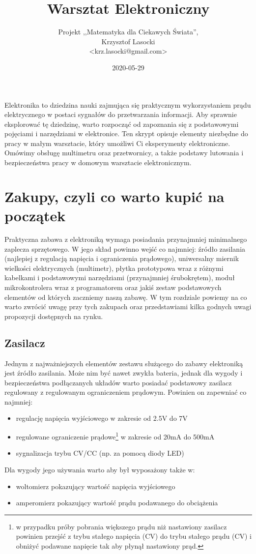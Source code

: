\documentclass{pdfBooklets}
\title{Warsztat Elektroniczny}
\author{%
	Projekt ,,Matematyka dla Ciekawych Świata'',\\
	Krzysztof Lasocki\\\normalsize\ttfamily <krz.lasocki@gmail.com>
}
\date  {2020-05-29}
\begin{document}
\maketitle

Elektronika to dziedzina nauki zajmująca się praktycznym wykorzystaniem prądu elektrycznego w postaci sygnałów do przetwarzania
informacji. Aby sprawnie eksplorować tę dziedzinę, warto rozpocząć od zapoznania się z podstawowymi pojęciami i narzędziami w
elektronice. Ten skrypt opisuje elementy niezbędne do pracy w małym warsztacie, który umożliwi Ci eksperymenty elektroniczne.
Omówimy obsługę multimetru oraz przetwornicy, a także podstawy lutowania i bezpieczeństwa pracy w domowym warsztacie elektronicznym.

\section{Zakupy, czyli co warto kupić na początek}

Praktyczna zabawa z elektroniką wymaga posiadania przynajmniej minimalnego zaplecza sprzętowego.
W jego skład powinno wejść co najmniej:
	źródło zasilania (najlepiej z regulacją napięcia i ograniczenia prądowego),
	uniwersalny miernik wielkości elektrycznych (multimetr),
	płytka prototypowa wraz z różnymi kabelkami i podstawowymi narzędziami (przynajmniej śrubokrętem),
	moduł mikrokontrolera wraz z programatorem
	oraz jakiś zestaw podstawowych elementów od których zaczniemy naszą zabawę.
W tym rozdziale powiemy na co warto zwrócić uwagę przy tych zakupach oraz przedstawiami kilka godnych uwagi propozycji dostępnych na rynku.

\subsection{Zasilacz}
	Jednym z najważniejszych elementów zestawu służącego do zabawy elektroniką jest źródło zasilania.
	Może nim być nawet zwykła bateria, jednak dla wygody i bezpieczeństwa podłączanych układów warto posiadać podstawowy zasilacz regulowany z regulowanym ograniczeniem prądowym.
	Powinien on zapewniać co najmniej:
	\begin{itemize}
		\item regulację napięcia wyjściowego w zakresie od 2.5V do 7V
		\item regulowane ograniczenie prądowe\footnote{
			w przypadku próby pobrania większego prądu niż nastawiony zasilacz powinien
			przejść z trybu stałego napięcia (CV) do trybu stałego prądu (CV)
			i obniżyć podawane napięcie tak aby płynął nastawiony prąd.
		} w zakresie od 20mA do 500mA
		\item sygnalizacja trybu CV/CC (np. za pomocą diody LED)
	\end{itemize}
	Dla wygody jego używania warto aby był wyposażony także w:
	\begin{itemize}
		\item woltomierz pokazujący wartość napięcia wyjściowego
		\item amperomierz pokazujący wartość prądu podawanego do obciążenia
	\end{itemize}
	
\end{document}
